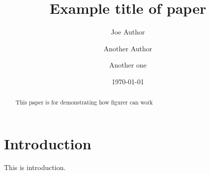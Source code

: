 \documentclass[twoside]{article}
\begin{document}
\title{Example title of paper}

\author{Joe Author}

\author{Another Author}
\author{Another one}

\date{\today}
\begin{abstract}
This paper is for demonstrating how figurer can work
\end{abstract}

\maketitle

\section{\label{sec:level1}Introduction}

This is introduction.
\end{document}

